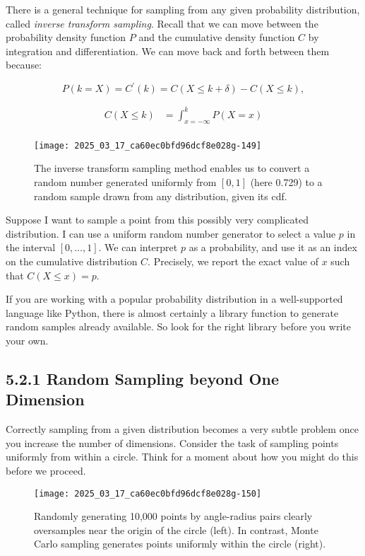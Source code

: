 \documentclass[10pt]{article}
\begin{document}
There is a general technique for sampling from any given probability distribution, called \textit{inverse transform sampling}. Recall that we can move between the probability density function $P$ and the cumulative density function $C$ by integration and differentiation. We can move back and forth between them because:

\[
P(k=X)=C^{\prime}(k)=C(X \leq k+\delta)-C(X \leq k),
\]

\begin{align*}
C(X \leq k) &= \int_{x=-\infty}^{k} P(X=x) \\
\end{align*}

\begin{figure}[H]
\centering
\texttt{[image: 2025\_03\_17\_ca60ec0bfd96dcf8e028g-149]}
\caption{The inverse transform sampling method enables us to convert a random number generated uniformly from $[0,1]$ (here 0.729) to a random sample drawn from any distribution, given its cdf.}
\end{figure}

Suppose I want to sample a point from this possibly very complicated distribution. I can use a uniform random number generator to select a value $p$ in the interval $[0, \ldots, 1]$. We can interpret $p$ as a probability, and use it as an index on the cumulative distribution $C$. Precisely, we report the exact value of $x$ such that $C(X \leq x)=p$.

If you are working with a popular probability distribution in a well-supported language like Python, there is almost certainly a library function to generate random samples already available. So look for the right library before you write your own.

\subsection*{5.2.1 Random Sampling beyond One Dimension}
Correctly sampling from a given distribution becomes a very subtle problem once you increase the number of dimensions. Consider the task of sampling points uniformly from within a circle. Think for a moment about how you might do this before we proceed.

\begin{figure}[H]
\centering
\texttt{[image: 2025\_03\_17\_ca60ec0bfd96dcf8e028g-150]}
\caption{Randomly generating 10,000 points by angle-radius pairs clearly oversamples near the origin of the circle (left). In contrast, Monte Carlo sampling generates points uniformly within the circle (right).}
\end{figure}
\end{document}
